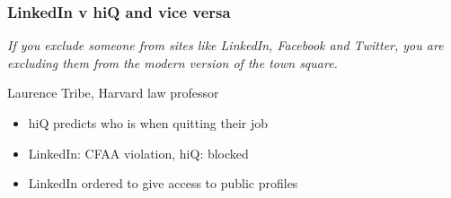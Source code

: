 \begin{frame}
    \frametitle{LinkedIn v hiQ and vice versa}
{
\center
\textit{
\large
If you exclude someone from sites like LinkedIn, Facebook and Twitter, you are excluding them from the modern version of the town square. }
} \\
\vspace{-10pt}
\begin{flushright}
Laurence Tribe, Harvard law professor
\end{flushright}
\vspace{10pt}
\begin{itemize}
    \item hiQ predicts who is when quitting their job
    \item LinkedIn: CFAA violation, hiQ: blocked
    \item LinkedIn ordered to give access to public profiles
\end{itemize}
\end{frame}

